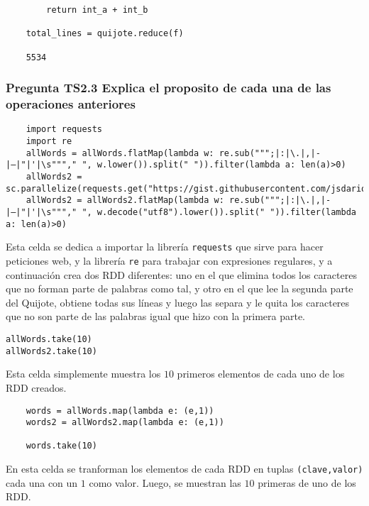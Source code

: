 \documentclass[11pt]{article}
\def\inline{\lstinline[basicstyle=\ttfamily,keywordstyle={}]}
\begin{document}
{{\begin{itemize}
\begin{verbatim}
        return int_a + int_b
      
    total_lines = quijote.reduce(f)

    5534
    \end{verbatim}


\subsubsection{ Pregunta TS2.3 Explica el proposito de cada una de las operaciones anteriores}

\begin{verbatim}
    import requests
    import re
    allWords = allWords.flatMap(lambda w: re.sub(""";|:|\.|,|-|–|"|'|\s"""," ", w.lower()).split(" ")).filter(lambda a: len(a)>0)
    allWords2 = sc.parallelize(requests.get("https://gist.githubusercontent.com/jsdario/9d871ed773c81bf217f57d1db2d2503f/raw/585de69b0631c805dabc6280506717943b82ba4a/el_quijote_ii.txt").iter_lines())
    allWords2 = allWords2.flatMap(lambda w: re.sub(""";|:|\.|,|-|–|"|'|\s"""," ", w.decode("utf8").lower()).split(" ")).filter(lambda a: len(a)>0)
\end{verbatim}

Esta celda se dedica a importar la librería \inline{requests} que sirve para hacer peticiones web, y la librería \inline{re} para trabajar con expresiones regulares, y a continuación crea dos RDD diferentes: uno en el que elimina todos los caracteres que no forman parte de palabras como tal, y otro en el que lee la segunda parte del Quijote, obtiene todas sus líneas y luego las separa y le quita los caracteres que no son parte de las palabras igual que hizo con la primera parte.

\begin{verbatim}
allWords.take(10)
allWords2.take(10)
\end{verbatim}

Esta celda simplemente muestra los $10$ primeros elementos de cada uno de los RDD creados.


\begin{verbatim}
    words = allWords.map(lambda e: (e,1))
    words2 = allWords2.map(lambda e: (e,1))
    
    words.take(10)
\end{verbatim}

En esta celda se tranforman los elementos de cada RDD en tuplas \inline{(clave,valor)} cada una con un $1$ como valor. Luego, se muestran las $10$ primeras de uno de los RDD.


\end{itemize}}}
\end{document}
